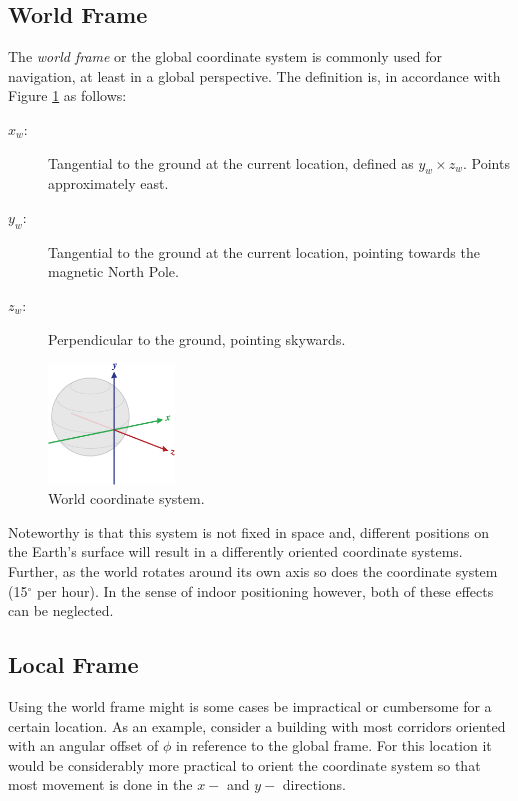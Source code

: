 \documentclass{LTHthesis}
\begin{document}
\subsection{World Frame}
%
The \emph{world frame} or the global coordinate system is commonly used for navigation, at least in a global perspective. The definition is, in accordance with Figure \ref{axis_globe} as follows:
%
\begin{description}
\item[$x_w$:] Tangential to the ground at the current location, defined as $y_w\times z_w$. Points approximately east. 
\item[$y_w$:] Tangential to the ground at the current location, pointing towards the magnetic North Pole.
\item[$z_w$:] Perpendicular to the ground, pointing skywards.
\end{description}
%
\begin{figure}[!hbt]
\begin{center}

\includegraphics[width=0.3\textwidth ]{images/background_on_navigation/axis_globe.png}
\end{center}
\caption[]{World coordinate system.\footnotemark}\label{axis_globe}
\end{figure}
%
%
Noteworthy is that this system is not fixed in space and, different positions on the Earth's surface will result in a differently oriented coordinate systems. Further, as the world rotates around its own axis so does the coordinate system (15$^\circ$ per hour). In the sense of indoor positioning however, both of these effects can be neglected.
%
\subsection{Local Frame}
%
Using the world frame might is some cases be impractical or cumbersome for a certain location. As an example, consider a  building with most corridors oriented with an angular offset of $\phi$ in reference to the global frame. For this location it would be considerably more practical to orient the coordinate system so that most movement is done in the $x-$ and $y-$ directions.   
\end{document}
